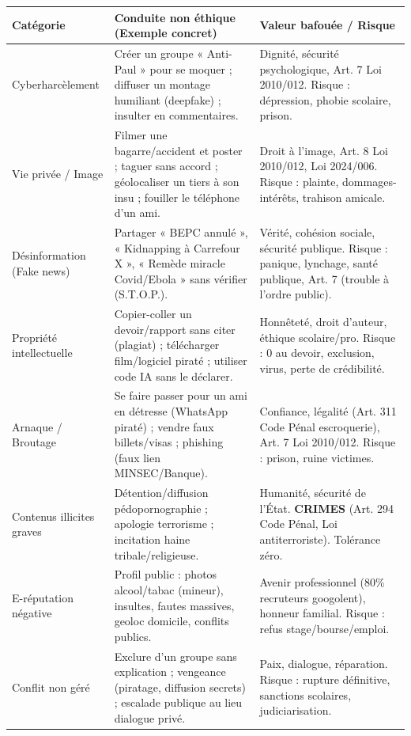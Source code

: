 \documentclass[11pt]{article}
\newcommand{\cle}[1]{{\popxbold\color{popdark}#1}}
\begin{document}
\begin{exemplebox}
\begin{center}
\begin{tabularx}{\linewidth}{|l|X|X|}
\hline
\textbf{Catégorie} & \textbf{Conduite non éthique (Exemple concret)} & \textbf{Valeur bafouée / Risque} \\
\hline
\cle{Cyberharcèlement} & Créer un groupe « Anti-Paul » pour se moquer ; diffuser un montage humiliant (deepfake) ; insulter en commentaires. & Dignité, sécurité psychologique, Art. 7 Loi 2010/012. Risque : dépression, phobie scolaire, prison. \\
\hline
\cle{Vie privée / Image} & Filmer une bagarre/accident et poster ; taguer sans accord ; géolocaliser un tiers à son insu ; fouiller le téléphone d'un ami. & Droit à l'image, Art. 8 Loi 2010/012, Loi 2024/006. Risque : plainte, dommages-intérêts, trahison amicale. \\
\hline
\cle{Désinformation (Fake news)} & Partager « BEPC annulé », « Kidnapping à Carrefour X », « Remède miracle Covid/Ebola » sans vérifier (S.T.O.P.). & Vérité, cohésion sociale, sécurité publique. Risque : panique, lynchage, santé publique, Art. 7 (trouble à l'ordre public). \\
\hline
\cle{Propriété intellectuelle} & Copier-coller un devoir/rapport sans citer (plagiat) ; télécharger film/logiciel piraté ; utiliser code IA sans le déclarer. & Honnêteté, droit d'auteur, éthique scolaire/pro. Risque : 0 au devoir, exclusion, virus, perte de crédibilité. \\
\hline
\cle{Arnaque / Broutage} & Se faire passer pour un ami en détresse (WhatsApp piraté) ; vendre faux billets/visas ; phishing (faux lien MINSEC/Banque). & Confiance, légalité (Art. 311 Code Pénal escroquerie), Art. 7 Loi 2010/012. Risque : prison, ruine victimes. \\
\hline
\cle{Contenus illicites graves} & Détention/diffusion pédopornographie ; apologie terrorisme ; incitation haine tribale/religieuse. & Humanité, sécurité de l'État. \textbf{CRIMES} (Art. 294 Code Pénal, Loi antiterroriste). Tolérance zéro. \\
\hline
\cle{E-réputation négative} & Profil public : photos alcool/tabac (mineur), insultes, fautes massives, geoloc domicile, conflits publics. & Avenir professionnel (80\% recruteurs googolent), honneur familial. Risque : refus stage/bourse/emploi. \\
\hline
\cle{Conflit non géré} & Exclure d'un groupe sans explication ; vengeance (piratage, diffusion secrets) ; escalade publique au lieu dialogue privé. & Paix, dialogue, réparation. Risque : rupture définitive, sanctions scolaires, judiciarisation. \\

\end{tabularx}
\end{center}
\end{exemplebox}
\end{document}
